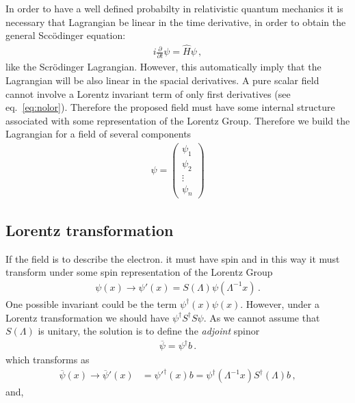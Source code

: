 In order to have a well defined probabilty in relativistic quantum mechanics it is necessary that Lagrangian be linear in the time derivative, in order to obtain the general Sccödinger equation:
\begin{align}
  i\frac{\partial}{\partial t}\psi=\hat{H} \psi\,,  
\end{align}
like the Scrödinger Lagrangian. However, this automatically imply that the Lagrangian will be also linear in the spacial derivatives. A pure scalar field cannot involve a Lorentz invariant term of only first derivatives (see eq.~\eqref{eq:nolor}). Therefore the proposed field must have some internal structure associated with some representation of the Lorentz Group. Therefore we build the Lagrangian for a field of several components
\begin{align}
  \psi=  \begin{pmatrix}
\psi_1\\
\psi_2\\
\vdots\\
\psi_n    
  \end{pmatrix}
\end{align}

\subsection{Lorentz transformation}

If the field is to describe the electron. it must have spin and in this way it must transform under some spin representation of the Lorentz Group
\begin{align}
  \psi(x)\to \psi'(x)=S(\Lambda)\psi\left(\Lambda^{-1}x\right)\,.
\end{align}
One possible invariant could be the term $\psi^\dagger(x)\psi(x)$. However, under a Lorentz transformation we should have $\psi^\dagger S^\dagger S\psi$. As we cannot assume that $S(\Lambda)$ is unitary, the solution is to define the \emph{adjoint} spinor
\begin{align}
  \overline{\psi}=\psi^\dagger b\,.
\end{align}
which transforms as
\begin{align}
  \overline{\psi}(x)\to  \overline{\psi}'(x)&=
{\psi'}^\dagger(x)b=
\psi^\dagger\left(\Lambda^{-1}x\right)S^\dagger(\Lambda)b\,,
\end{align}
and,

